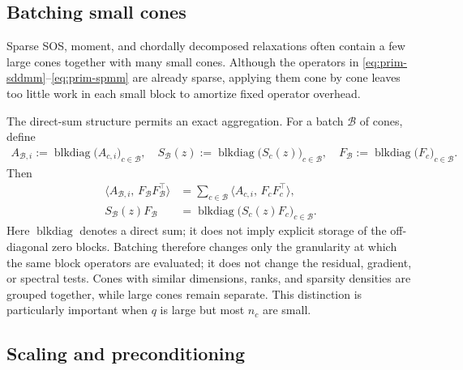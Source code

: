 \documentclass[11pt]{article}
\theoremstyle{definition}
\theoremstyle{remark}
\newcommand{\inner}[2]{\langle #1,\, #2\rangle}
\newcommand{\blkdiag}{\operatorname{blkdiag}}
\begin{document}
\subsection{Batching small cones}
\label{subsec:conebatch}

Sparse SOS, moment, and chordally decomposed relaxations often contain a few
large cones together with many small cones.  Although the operators in
\eqref{eq:prim-sddmm}--\eqref{eq:prim-spmm} are already sparse, applying them
cone by cone leaves too little work in each small block to amortize fixed
operator overhead.

The direct-sum structure permits an exact aggregation.  For a batch
$\mathcal B$ of cones, define
\begin{equation}
\begin{aligned}
  A_{\mathcal B,i}
:=\blkdiag\bigl(A_{c,i}\bigr)_{c\in\mathcal B},\quad 
  S_{\mathcal B}(z)
    :=\blkdiag\bigl(S_c(z)\bigr)_{c\in\mathcal B},\quad
  F_{\mathcal B}
:=\blkdiag\bigl(F_c\bigr)_{c\in\mathcal B}.
\end{aligned}
\label{eq:batchop}
\end{equation}
Then
\begin{equation}
\begin{aligned}
  \inner{A_{\mathcal B,i}}
        {F_{\mathcal B}F_{\mathcal B}^\top}
    &=\sum_{c\in\mathcal B}\inner{A_{c,i}}{F_cF_c^\top},\\
  S_{\mathcal B}(z)F_{\mathcal B}
    &=\blkdiag\bigl(S_c(z)F_c\bigr)_{c\in\mathcal B}.
\end{aligned}
\label{eq:batch-identities}
\end{equation}
Here $\blkdiag$ denotes a direct sum; it does not imply explicit storage of
the off-diagonal zero blocks.
Batching therefore changes only the granularity at which the same block
operators are evaluated; it does not change the residual, gradient, or
spectral tests.  Cones with similar dimensions, ranks, and sparsity densities
are grouped together, while large cones remain separate.  This distinction
is particularly important when $q$ is large but most $n_c$ are
small.

\subsection{Scaling and preconditioning}
\label{subsec:precond}
\end{document}
